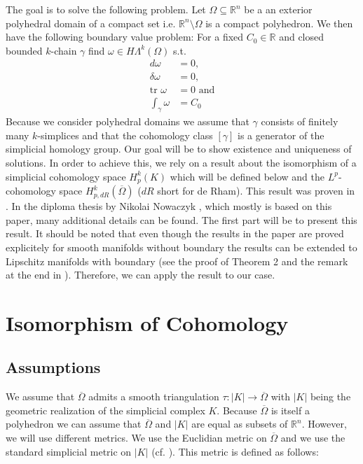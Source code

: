 \documentclass[12pt,a4paper]{article}
\newcommand{\omegabar}{\overline{\Omega}}
\newcommand{\real}{\mathbb{R}}
\begin{document}
The goal is to solve the following problem. Let $\Omega \subseteq \real^n$ be a
an exterior polyhedral domain of a compact set i.e. $\real^n \setminus \Omega$ 
is a compact polyhedron. We then have the following boundary value
problem: For a fixed $C_0 \in \real$ and closed bounded $k$-chain $\gamma$ 
find $\omega \in H\Lambda^k(\Omega)$ s.t.
\begin{align*}
    d\omega &= 0, \\
    \delta\omega &= 0, \\
    \text{tr } \omega &= 0 \text{ and} \\
    \int_\gamma \omega &= C_0
\end{align*}
Because we consider polyhedral domains we assume that $\gamma$ consists of 
finitely many $k$-simplices and that the cohomology class $[\gamma]$ is a 
generator of the simplicial homology group.
Our goal will be to show existence and uniqueness of solutions. In order to 
achieve this, we rely on a result about the isomorphism of a simplicial 
cohomology space $H^k_p(K)$ which will be defined below
and the $L^p$-cohomology space $H^k_{p,dR}(\omegabar)$ ($dR$ short for de Rham).
This result was proven in \cite{goldshtein}. In the diploma thesis by Nikolai
Nowaczyk \cite{nowaczyk}, which mostly is based on this paper, 
many additional details can be found. The first part will be to present this 
result. It should be noted that even though the results in the paper are proved
explicitely for smooth manifolds without boundary the results can be 
extended to Lipschitz manifolds with boundary (see the proof of Theorem 2 and 
the remark at the end in \cite{goldshtein}). Therefore, we can apply the result
to our case.

\section{Isomorphism of Cohomology}

\subsection{Assumptions}
We assume that $\omegabar$ admits a smooth triangulation $\tau: |K|
\rightarrow \omegabar$ with $|K|$ being the geometric realization of the
simplicial complex $K$. Because $\omegabar$ is itself a polyhedron we can
assume that $\omegabar$ and $|K|$ are equal as subsets of $\real^n$. 
However, we will use different metrics. We use the Euclidian metric on 
$\omegabar$ and we use the standard simplicial metric on $|K|$ (cf. 
\cite[p.191]{goldshtein}). This metric is defined as follows:
\end{document}
